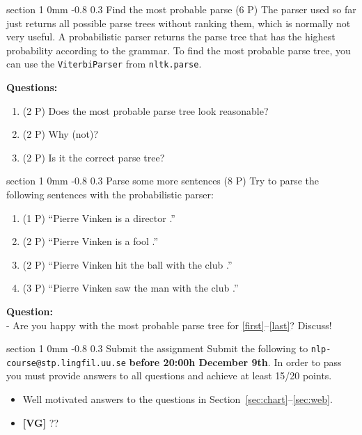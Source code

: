 \documentclass[11pt]{article}
\makeatletter
\newcommand{\newsec}[2]{\section{#1}\label{sec:#2}\noindent}
\renewcommand{\section}{\@startsection
{section}%
{1}%
{0mm}%
{-0.8\baselineskip}%
{0.3\baselineskip}%
{\bfseries\large}}%
\makeatother
\begin{document}
\newsec{Find the most probable parse (6 P)}{viterbi}%
The parser used so far just returns all possible parse trees without ranking them, which is normally not very useful.  
A probabilistic parser returns the parse tree that has the highest probability according to the grammar. To find the most
probable parse tree, you can use the {\tt ViterbiParser} from {\tt nltk.parse}. 
\begin{center}
\fbox{

}
\end{center}
{\bf Questions:}
\begin{enumerate}[noitemsep,topsep=0.2cm]
\item (2 P) Does the most probable parse tree look reasonable? 
\item (2 P) Why (not)? 
\item (2 P) Is it the correct parse tree?
\end{enumerate}

\clearpage
\newsec{Parse some more sentences (8 P)}{web}%
Try to parse the following sentences with the probabilistic parser:
\begin{enumerate}[noitemsep,topsep=0.2cm]
\item (1 P) ``Pierre Vinken is a director .''\label{first}
\item (2 P) ``Pierre Vinken is a fool .''
\item (2 P) ``Pierre Vinken hit the ball with the club .''
\item (3 P) ``Pierre Vinken saw the man with the club .''\label{last}
\end{enumerate}

\noindent
{\bf Question:}\\
- Are you happy with the most probable parse tree for \ref{first}--\ref{last}? Discuss!

\newsec{Submit the assignment}{sub}%
Submit the following to {\tt nlp-course@stp.lingfil.uu.se} \textbf{before 20:00h December 9th}. In order to pass you must provide answers to all questions and achieve at least 15/20 points.  
\begin{itemize}[noitemsep,topsep=0.2cm]
\item Well motivated answers to the questions in Section~\ref{sec:chart}--\ref{sec:web}.
\item \textbf{[VG]} ??
\end{itemize}
\end{document}
